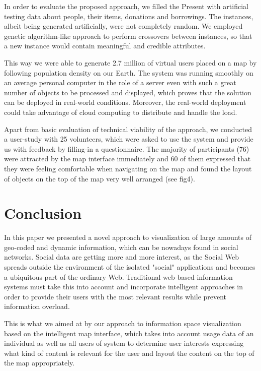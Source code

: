 \documentclass[10pt]{article}
\begin{document}
In order to evaluate the proposed approach, we filled the Present with artificial testing data about people, their items, donations and borrowings. The instances, albeit being generated artificially, were not completely random. We employed genetic algorithm-like approach to perform crossovers between instances, so that a new instance would contain meaningful and credible attributes.

This way we were able to generate 2.7 million of virtual users placed on a map by following population density on our Earth. The system was running smoothly on an average personal computer in the role of a server even with such a great number of objects to be processed and displayed, which proves that the solution can be deployed in real-world conditions. Moreover, the real-world deployment could take advantage of cloud computing to distribute and handle the load.

Apart from basic evaluation of technical viability of the approach, we conducted a user-study with 25 volunteers, which were asked to use the system and provide us with feedback by filling-in a questionnaire. The majority of participants (76) were attracted by the map interface immediately and 60 of them expressed that they were feeling comfortable when navigating on the map and found the layout of objects on the top of the map very well arranged (see fig4).

\section{Conclusion}
In this paper we presented a novel approach to visualization of large amounts of geo-coded and dynamic information, which can be nowadays found in social networks. Social data are getting more and more interest, as the Social Web spreads outside the
 environment of the isolated "social" applications and becomes a ubiquitous part of the ordinary Web. Traditional web-based information systems must take this into account and incorporate intelligent approaches in order to provide their users with the most relevant results while prevent information overload.

This is what we aimed at by our approach to information space visualization based on the intelligent map interface, which takes into account usage data of an individual as well as all users of system to determine user interests expressing what kind of content is relevant for the user and layout the content on the top of the map appropriately.
\end{document}
